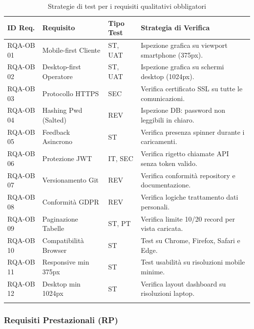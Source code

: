 \documentclass[a4paper,11pt,oneside]{scrartcl}
\begin{document}
\begin{longtable}{|p{1.5cm}|p{5.5cm}|p{1.8cm}|p{5cm}|}
\hline
\textbf{ID Req.} & \textbf{Requisito} & \textbf{Tipo Test} & \textbf{Strategia di Verifica} \\
\hline
RQA-OB 01 & Mobile-first Cliente & ST, UAT & Ispezione grafica su viewport smartphone (375px). \\ \hline
RQA-OB 02 & Desktop-first Operatore & ST, UAT & Ispezione grafica su schermi desktop (1024px). \\ \hline
RQA-OB 03 & Protocollo HTTPS & SEC & Verifica certificato SSL su tutte le comunicazioni. \\ \hline
RQA-OB 04 & Hashing Pwd (Salted) & REV & Ispezione DB: password non leggibili in chiaro. \\ \hline
RQA-OB 05 & Feedback Asincrono & ST & Verifica presenza spinner durante i caricamenti. \\ \hline
RQA-OB 06 & Protezione JWT & IT, SEC & Verifica rigetto chiamate API senza token valido. \\ \hline
RQA-OB 07 & Versionamento Git & REV & Verifica conformità repository e documentazione. \\ \hline
RQA-OB 08 & Conformità GDPR & REV & Verifica logiche trattamento dati personali. \\ \hline
RQA-OB 09 & Paginazione Tabelle & ST, PT & Verifica limite 10/20 record per vista caricata. \\ \hline
RQA-OB 10 & Compatibilità Browser & ST & Test su Chrome, Firefox, Safari e Edge. \\ \hline
RQA-OB 11 & Responsive min 375px & ST & Test usabilità su risoluzioni mobile minime. \\ \hline
RQA-OB 12 & Desktop min 1024px & ST & Verifica layout dashboard su risoluzioni laptop. \\ \hline
\caption{Strategie di test per i requisiti qualitativi obbligatori}
\end{longtable}

\newpage
\subsubsection{Requisiti Prestazionali (RP)}
\end{document}
